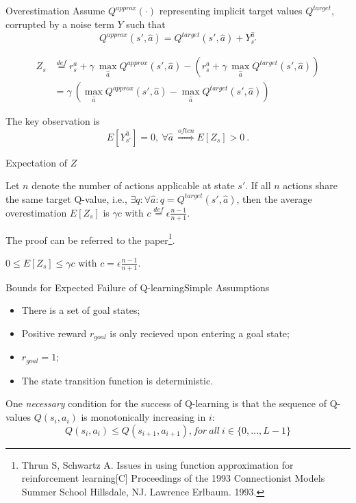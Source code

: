 \documentclass{beamer}
\newcommand{\qa}{Q^{approx}}
\newcommand{\qt}{Q^{target}}
\newcommand{\ha}{\hat{a}}
\begin{document}
\begin{frame}{Overestimation}
	Assume $Q^{approx}(\cdot)$ representing implicit target values $Q^{target}$, corrupted by a noise term $Y$ such that
	\begin{equation}\nonumber
		\qa(s',\ha) = \qt(s', \ha) + Y_{s'}^{\ha}
	\end{equation}
	
	\begin{equation}
	\begin{aligned}
		Z_s &\overset{def}{=} r_s^a + \gamma~ \max_{\ha} \qa(s', \ha) - \left( r_s^a + \gamma~  \max_{\ha} \qt(s', \ha)\right) \\
		& = \gamma~ \left( \max_{\ha} \qa(s', \ha) - \max_{\ha} \qt(s', \ha)\right)
	\end{aligned}
	\end{equation}
	
	The key observation is
	\begin{equation}\nonumber
		E[Y_{s'}^{\ha}] = 0, ~ \forall \ha ~ \overset{often}{\Longrightarrow} E[Z_s] > 0 ~.
	\end{equation}
\end{frame}

\begin{frame}{Expectation of $Z$}
	\begin{Lemma}
		Let $n$ denote the number of actions applicable at state $s'$. If all $n$ actions share the same target Q-value, i.e., $\exists q: \forall \ha: q=\qt(s', \ha)$, then the average overestimation $E[Z_s]$ is $\gamma c$ with $c \overset{def}{=} \epsilon \frac{n-1}{n+1}$.
	\end{Lemma}

	The proof can be referred to the paper\footnote{\tiny{Thrun S, Schwartz A. Issues in using function approximation for reinforcement learning[C] Proceedings of the 1993 Connectionist Models Summer School Hillsdale, NJ. Lawrence Erlbaum. 1993.}}.
	\begin{Corollary}
		$0 \leq E[Z_s] \leq \gamma c$ with $c = \epsilon \frac{n-1}{n+1}$.
	\end{Corollary}
\end{frame}


\begin{frame}{Bounds for Expected Failure of Q-learning}{Simple Assumptions}
	\begin{itemize}
		\item There is a set of goal states;
		\item Positive reward $r_{goal}$ is only recieved upon entering a goal state;
		\item $r_{goal} = 1$;
		\item The state transition function is deterministic.
	\end{itemize}

	One \textit{necessary} condition for the success of Q-learning is that the sequence of Q-values $Q(s_i, a_i)$ is monotonically increasing in $i$:
	\begin{equation}
		Q(s_i, a_i) \leq Q(s_{i+1}, a_{i+1}), for~all~ i \in \{0, \ldots, L-1\}
	\end{equation}
\end{frame}
\end{document}
